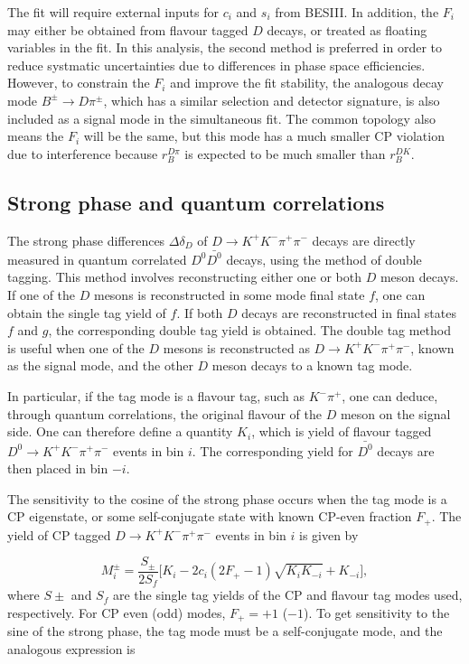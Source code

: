 \documentclass[12pt, a4paper, notitlepage, onecolumn]{article}
\numberwithin{equation}{section}
\begin{document}
The fit will require external inputs for $c_i$ and $s_i$ from BESIII. In addition, the $F_i$ may either be obtained from flavour tagged $D$ decays, or treated as floating variables in the fit. In this analysis, the second method is preferred in order to reduce systmatic uncertainties due to differences in phase space efficiencies. However, to constrain the $F_i$ and improve the fit stability, the analogous decay mode $B^\pm\to D\pi^\pm$, which has a similar selection and detector signature, is also included as a signal mode in the simultaneous fit. The common topology also means the $F_i$ will be the same, but this mode has a much smaller CP violation due to interference because $r_B^{D\pi}$ is expected to be much smaller than $r_B^{DK}$.

\subsection{Strong phase and quantum correlations}
The strong phase differences $\Delta\delta_D$ of $D\to K^+K^-\pi^+\pi^-$ decays are directly measured in quantum correlated $D^0\bar{D^0}$ decays, using the method of double tagging. This method involves reconstructing either one or both $D$ meson decays. If one of the $D$ mesons is reconstructed in some mode final state $f$, one can obtain the single tag yield of $f$. If both $D$ decays are reconstructed in final states $f$ and $g$, the corresponding double tag yield is obtained. The double tag method is useful when one of the $D$ mesons is reconstructed as $D\to K^+K^-\pi^+\pi^-$, known as the signal mode, and the other $D$ meson decays to a known tag mode.

In particular, if the tag mode is a flavour tag, such as $K^-\pi^+$, one can deduce, through quantum correlations, the original flavour of the $D$ meson on the signal side. One can therefore define a quantity $K_i$, which is yield of flavour tagged $D^0\to K^+K^-\pi^+\pi^-$ events in bin $i$. The corresponding yield for $\bar{D^0}$ decays are then placed in bin $-i$.

The sensitivity to the cosine of the strong phase occurs when the tag mode is a CP eigenstate, or some self-conjugate state with known CP-even fraction $F_+$. The yield of CP tagged $D\to K^+K^-\pi^+\pi^-$ events in bin $i$ is given by

\begin{equation}
  M_i^\pm = \frac{S_\pm}{2S_f}\Big[K_i - 2c_i(2F_+ - 1)\sqrt{K_iK_{-i}} + K_{-i}\Big],
\end{equation}
where $S\pm$ and $S_f$ are the single tag yields of the CP and flavour tag modes used, respectively. For CP even (odd) modes, $F_+ = +1$ ($-1$). To get sensitivity to the sine of the strong phase, the tag mode must be a self-conjugate mode, and the analogous expression is
\end{document}
